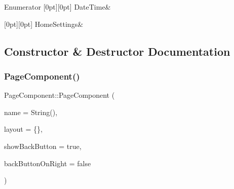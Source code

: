 \begin{DoxyEnumFields}{Enumerator}
[0pt][0pt]{}\mbox{\label{classPageComponent_a39cf3ea9f212fd4383133881dec6e26aa49ddd79f45c4197a50e402e76bee860b}} 
Date\+Time&\\
\hline

[0pt][0pt]{}\mbox{\label{classPageComponent_a39cf3ea9f212fd4383133881dec6e26aa64a3870f987bbe66354a72dba1656820}} 
Home\+Settings&\\
\hline

\end{DoxyEnumFields}


\subsection{Constructor \& Destructor Documentation}
\mbox{\label{classPageComponent_aa3fec95406141cea5175afc08b93a3c2}} 
\subsubsection{\texorpdfstring{Page\+Component()}{PageComponent()}}
{\footnotesize\ttfamily Page\+Component\+::\+Page\+Component (\begin{DoxyParamCaption}\item[{const String \&}]{name = {\ttfamily String()},  }\item[{\mbox{\hyperlink{classRelativeLayoutManager_a3dcd4cd0bc41754f3b4a64bc29b5eca5}{Relative\+Layout\+Manager\+::\+Layout}}}]{layout = {\ttfamily \{\}},  }\item[{bool}]{show\+Back\+Button = {\ttfamily true},  }\item[{bool}]{back\+Button\+On\+Right = {\ttfamily false} }\end{DoxyParamCaption})}


